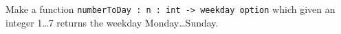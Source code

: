 Make a function \lstinline{numberToDay : n : int -> weekday option} which given an integer 1\dots 7 returns the weekday Monday\dots Sunday.